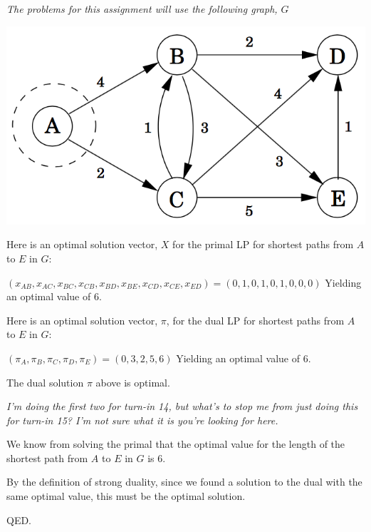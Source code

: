 \documentclass[10pt]{article}
\begin{document}
\emph{The problems for this assignment will use the following graph, $G$}

\includegraphics[scale=0.5]{graph}

\begin{problems}

  \problem

  Here is an optimal solution vector, $X$ for the primal LP for shortest paths from $A$ to $E$ in $G$:

  $(x_{AB}, x_{AC}, x_{BC}, x_{CB}, x_{BD}, x_{BE}, x_{CD}, x_{CE}, x_{ED}) = (0,1,0,1,0,1,0,0,0)$ Yielding an optimal value of 6.

  \medskip 
  \problem
  Here is an optimal solution vector, $\pi$, for the dual LP for shortest paths from $A$ to $E$ in $G$:

  $(\pi_A, \pi_B, \pi_C, \pi_D, \pi_E) = (0, 3, 2, 5, 6)$ Yielding an optimal value of 6.
  
  \medskip 
  \problem

\begin{lemma}
  The dual solution $\pi$ above is optimal.
\end{lemma}

\emph{I'm doing the first two for turn-in 14, but what's to stop me from just doing this for turn-in 15? 
      I'm not sure what it is you're looking for here.}

\begin{longFormProof}

      \step We know from solving the primal that the optimal value for the length of the shortest path from $A$ to $E$ in $G$ is 6.

      \step By the definition of strong duality, since we found a solution to the dual with the same optimal value, this must be the optimal solution.

      \step QED.

\end{longFormProof}

\end{problems}
\end{document}
